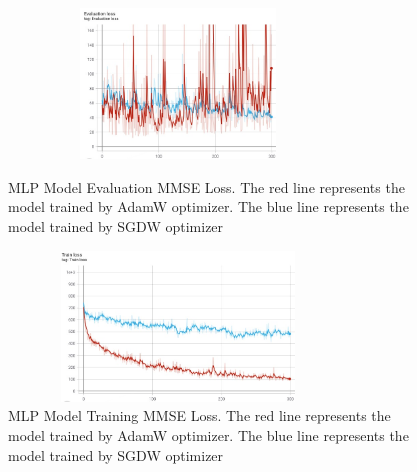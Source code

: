 \documentclass[final]{cvpr}
\begin{document}
\begin{figure}[htbp]
\centering
\begin{minipage}[t]{0.48\textwidth}
\centering
\includegraphics[width=9cm,height=4cm]{MLP eval.jpg} 
\caption{MLP Model Evaluation MMSE Loss. The red line represents the model trained by AdamW optimizer. The blue line represents the model trained by SGDW optimizer}
\end{minipage}
\begin{minipage}[t]{0.48\textwidth}
\centering
\includegraphics[width=9cm,height=4cm]{MLP train.jpg}
\caption{MLP Model Training MMSE Loss. The red line represents the model trained by AdamW optimizer. The blue line represents the model trained by SGDW optimizer}
\end{minipage}
\end{figure}



\end{document}
